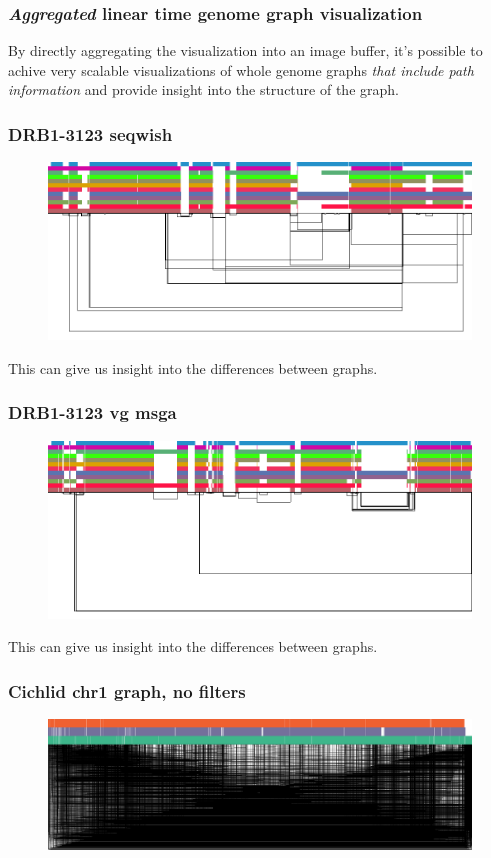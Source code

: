 \documentclass[aspectratio=169]{beamer}
\begin{document}
\begin{frame}[fragile]
  \frametitle{\emph{Aggregated} linear time genome graph visualization}
  By directly aggregating the visualization into an image buffer, it's possible to achive very scalable visualizations of whole genome graphs \emph{that include path information} and provide insight into the structure of the graph.
\end{frame}

\begin{frame}[fragile]
  \frametitle{DRB1-3123 seqwish}
  \begin{figure}
    \includegraphics[scale=0.4,center]{DRB1-3123-seqwish-dg.png}
  \end{figure}
  This can give us insight into the differences between graphs.
\end{frame}

\begin{frame}[fragile]
  \frametitle{DRB1-3123 vg msga}
  \begin{figure}
    \includegraphics[scale=0.4,center]{DRB1-3123-vg-dg.png}
  \end{figure}
  This can give us insight into the differences between graphs.
\end{frame}

\begin{frame}[fragile]
  \frametitle{Cichlid chr1 graph, no filters}
  \begin{figure}
    \includegraphics[scale=0.11,center]{cichlid-chr1-dg.png}
  \end{figure}
\end{frame}
\end{document}
